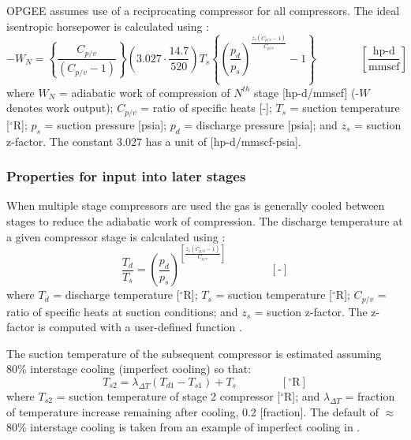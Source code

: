 \documentclass[11pt]{report}
\newcommand{\xlname}[1]{\raisebox{1pt}{\fcolorbox{light-gray}{light-gray}{\texttt{\textcolor{stanford}{\scriptsize{#1}}}}}}
\newcommand{\eqnunit}[1]{\quad\quad \scriptstyle{\left[\text{#1}\right]}}
\newcommand{\eqnunitfrac}[2]{\quad\quad \scriptstyle{\left[\frac{\text{#1}}{\text{#2}}\right]}}
\begin{document}
OPGEE assumes use of a reciprocating compressor for all compressors. The ideal isentropic horsepower is calculated using \cite[p. 105]{Jarrell2002}:  
\begin{equation} \label{eq:compressor_work}
-W_{N}=\left\{{\frac{C_{p/v}}{\left(C_{p/v}-1\right)}}\right\} \left(3.027 \cdot \frac{14.7}{520}\right) T_{s}\left\{\left(\frac{p_{d}}{p_{s}}\right)^\frac{z_{s}\left(C_{p/v}-1\right)}{C_{p/v}}-1\right\} \quad\quad\eqnunitfrac{hp-d}{mmscf}
\end{equation}
where $W_{N}$ = adiabatic work of compression of $N^{th}$ stage [hp-d/mmscf] (-$W$ denotes work output); $C_{p/v}$ = ratio of specific heats [-]; $T_{s}$ = suction temperature [$^{\circ}${R}]; $p_{s}$ = suction pressure [psia]; $p_{d}$ = discharge pressure [psia]; and $z_{s}$ = suction z-factor. The constant 3.027 has a unit of [hp-d/mmscf-psia].

\subsubsection{Properties for input into later stages}

When multiple stage compressors are used the gas is generally cooled between stages to reduce the adiabatic work of compression. The discharge temperature at a given compressor stage is calculated using \cite[p. 105]{Jarrell2002}: 
\begin{equation} \label{eq:compressor_discharge_temp}
\frac{T_{d}}{T_{s}}=\left(\frac{p_{d}}{p_{s}}\right)^{\left[\frac{z_{s}\left(C_{p/v}-1\right)}{C_{p/v}}\right]} \quad\quad\eqnunit{-}
\end{equation}
where $T_{d}$ = discharge temperature [$^{\circ}$R]; $T_{s}$ = suction temperature [$^{\circ}${R}]; $C_{p/v}$ = ratio of specific heats at suction conditions; and $z_{s}$ = suction z-factor. The z-factor is computed with a user-defined function \xlname{zfactor}.

The suction temperature of the subsequent compressor is estimated assuming 80\% interstage cooling (imperfect cooling) so that:
\begin{equation} \label{eq:compressor2_suction_temp}
T_{s2}= \lambda_{\Delta T}\left(T_{d1}-T_{s1}\right) +T_{s} \quad\quad\eqnunit{$^{\circ}${R}}
\end{equation}
where $T_{s2}$ = suction temperature of stage 2 compressor [$^{\circ}${R}]; and $\lambda_{\Delta T}$ = fraction of temperature increase remaining after cooling, 0.2 [fraction]. The default of $\approx$80\% interstage cooling is taken from an example of imperfect cooling in \cite[Table 7]{UNEP2006}.
\end{document}
